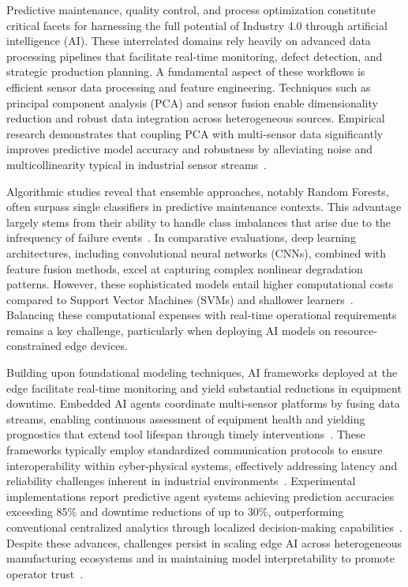 \documentclass[sigconf]{acmart}
\begin{document}
Predictive maintenance, quality control, and process optimization constitute critical facets for harnessing the full potential of Industry 4.0 through artificial intelligence (AI). These interrelated domains rely heavily on advanced data processing pipelines that facilitate real-time monitoring, defect detection, and strategic production planning. A fundamental aspect of these workflows is efficient sensor data processing and feature engineering. Techniques such as principal component analysis (PCA) and sensor fusion enable dimensionality reduction and robust data integration across heterogeneous sources. Empirical research demonstrates that coupling PCA with multi-sensor data significantly improves predictive model accuracy and robustness by alleviating noise and multicollinearity typical in industrial sensor streams~\cite{ref30,ref33}.

Algorithmic studies reveal that ensemble approaches, notably Random Forests, often surpass single classifiers in predictive maintenance contexts. This advantage largely stems from their ability to handle class imbalances that arise due to the infrequency of failure events~\cite{ref29}. In comparative evaluations, deep learning architectures, including convolutional neural networks (CNNs), combined with feature fusion methods, excel at capturing complex nonlinear degradation patterns. However, these sophisticated models entail higher computational costs compared to Support Vector Machines (SVMs) and shallower learners~\cite{ref24,ref32}. Balancing these computational expenses with real-time operational requirements remains a key challenge, particularly when deploying AI models on resource-constrained edge devices.

Building upon foundational modeling techniques, AI frameworks deployed at the edge facilitate real-time monitoring and yield substantial reductions in equipment downtime. Embedded AI agents coordinate multi-sensor platforms by fusing data streams, enabling continuous assessment of equipment health and yielding prognostics that extend tool lifespan through timely interventions~\cite{ref35}. These frameworks typically employ standardized communication protocols to ensure interoperability within cyber-physical systems, effectively addressing latency and reliability challenges inherent in industrial environments~\cite{ref36}. Experimental implementations report predictive agent systems achieving prediction accuracies exceeding 85\% and downtime reductions of up to 30\%, outperforming conventional centralized analytics through localized decision-making capabilities~\cite{ref35}. Despite these advances, challenges persist in scaling edge AI across heterogeneous manufacturing ecosystems and in maintaining model interpretability to promote operator trust~\cite{ref38}.
\end{document}
